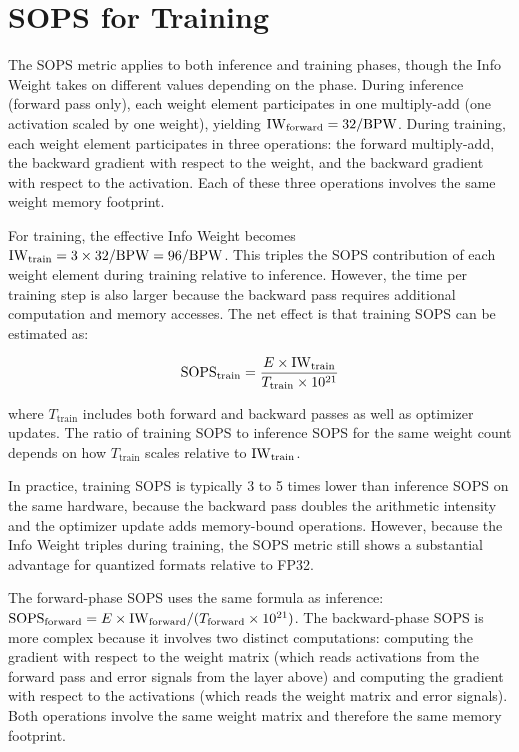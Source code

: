 \section{SOPS for Training}
\label{sec:sops_training}

The SOPS metric applies to both inference and training phases, though the Info Weight takes on different values depending on the phase. During inference (forward pass only), each weight element participates in one multiply-add (one activation scaled by one weight), yielding $\mathrm{IW}_{\text{forward}} = 32 / \textnormal{BPW}$. During training, each weight element participates in three operations: the forward multiply-add, the backward gradient with respect to the weight, and the backward gradient with respect to the activation. Each of these three operations involves the same weight memory footprint.

For training, the effective Info Weight becomes $\mathrm{IW}_{\text{train}} = 3 \times 32 / \textnormal{BPW} = 96 / \textnormal{BPW}$. This triples the SOPS contribution of each weight element during training relative to inference. However, the time per training step is also larger because the backward pass requires additional computation and memory accesses. The net effect is that training SOPS can be estimated as:

\begin{equation}
\text{SOPS}_{\text{train}} = \frac{E \times \mathrm{IW}_{\text{train}}}{T_{\text{train}} \times 10^{21}}
\label{eq:sops_training}
\end{equation}

where $T_{\text{train}}$ includes both forward and backward passes as well as optimizer updates. The ratio of training SOPS to inference SOPS for the same weight count depends on how $T_{\text{train}}$ scales relative to $\mathrm{IW}_{\text{train}}$.

In practice, training SOPS is typically 3 to 5 times lower than inference SOPS on the same hardware, because the backward pass doubles the arithmetic intensity and the optimizer update adds memory-bound operations. However, because the Info Weight triples during training, the SOPS metric still shows a substantial advantage for quantized formats relative to FP32.

The forward-phase SOPS uses the same formula as inference: $\text{SOPS}_{\text{forward}} = E \times \mathrm{IW}_{\text{forward}} / (T_{\text{forward}} \times 10^{21})$. The backward-phase SOPS is more complex because it involves two distinct computations: computing the gradient with respect to the weight matrix (which reads activations from the forward pass and error signals from the layer above) and computing the gradient with respect to the activations (which reads the weight matrix and error signals). Both operations involve the same weight matrix and therefore the same memory footprint.

